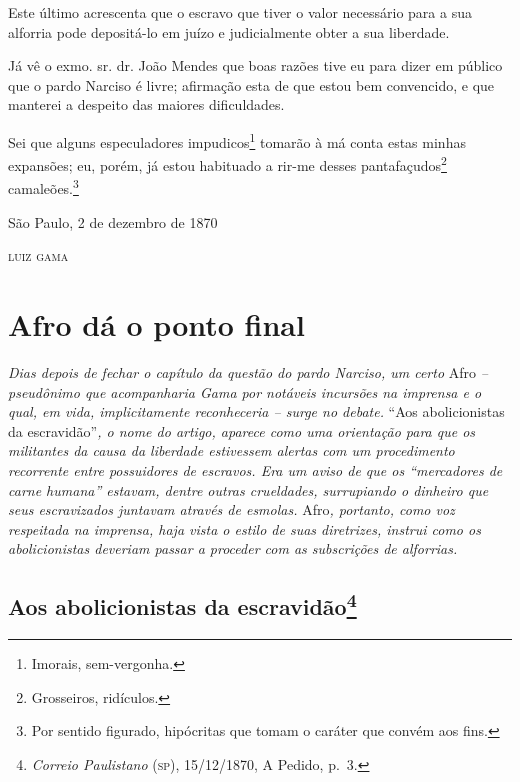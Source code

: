 Este último acrescenta que o escravo que tiver o valor necessário para a
sua alforria pode depositá-lo em juízo e judicialmente obter a sua
liberdade.

Já vê o exmo. sr. dr. João Mendes que boas razões tive eu para dizer em
público que o pardo Narciso é livre; afirmação esta de que estou bem
convencido, e que manterei a despeito das maiores dificuldades.

Sei que alguns especuladores impudicos\footnote{ Imorais,
  sem-vergonha.} tomarão à má conta estas minhas expansões; eu, porém,
já estou habituado a rir-me desses pantafaçudos\footnote{
  Grosseiros, ridículos.} camaleões.\footnote{
  Por sentido figurado, hipócritas que tomam o caráter que convém aos
  fins.}

\begin{flushright}
São Paulo, 2 de dezembro de 1870

\textsc{luiz gama}
\end{flushright}

\part{Afro dá o ponto final}

\begin{argumento}
\emph{Dias depois de fechar o capítulo da questão do pardo Narciso, um
certo} Afro \emph{-- pseudônimo que acompanharia Gama por notáveis
incursões na imprensa e o qual, em vida, implicitamente reconheceria --
surge no debate.} ``Aos abolicionistas da escravidão''\emph{, o nome do
artigo, aparece como uma orientação para que os militantes da causa da
liberdade estivessem alertas com um procedimento recorrente entre
possuidores de escravos. Era um aviso de que os ``mercadores de carne
humana'' estavam, dentre outras crueldades, surrupiando o dinheiro que
seus escravizados juntavam através de esmolas.} Afro\emph{, portanto,
como voz respeitada na imprensa, haja vista o estilo de suas diretrizes,
instrui como os abolicionistas deveriam passar a proceder com as
subscrições de alforrias.}
\end{argumento}

\chapter{Aos abolicionistas da escravidão\footnote{\emph{Correio Paulistano} (\textsc{sp}), 15/12/1870, A Pedido,
  p.~3.}} %

